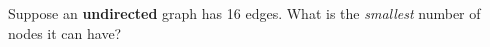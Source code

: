 \Needspace{1in}
\begin{prob}

    Suppose an \textbf{undirected} graph has 16 edges. What is the
    \emph{smallest} number of nodes it can have?



\end{prob}
